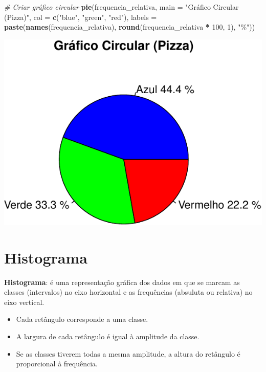 \documentclass[
]{book}
\newenvironment{Shaded}{\begin{snugshade}}{\end{snugshade}}
\newcommand{\AttributeTok}[1]{\textcolor[rgb]{0.13,0.29,0.53}{#1}}
\newcommand{\CommentTok}[1]{\textcolor[rgb]{0.56,0.35,0.01}{\textit{#1}}}
\newcommand{\DecValTok}[1]{\textcolor[rgb]{0.00,0.00,0.81}{#1}}
\newcommand{\FunctionTok}[1]{\textcolor[rgb]{0.13,0.29,0.53}{\textbf{#1}}}
\newcommand{\NormalTok}[1]{#1}
\newcommand{\SpecialCharTok}[1]{\textcolor[rgb]{0.81,0.36,0.00}{\textbf{#1}}}
\newcommand{\StringTok}[1]{\textcolor[rgb]{0.31,0.60,0.02}{#1}}
\begin{document}
\begin{Shaded}
\begin{Highlighting}[]
\CommentTok{\# Criar gráfico circular}
\FunctionTok{pie}\NormalTok{(frequencia\_relativa, }
    \AttributeTok{main =} \StringTok{"Gráfico Circular (Pizza)"}\NormalTok{,}
    \AttributeTok{col =} \FunctionTok{c}\NormalTok{(}\StringTok{"blue"}\NormalTok{, }\StringTok{"green"}\NormalTok{, }\StringTok{"red"}\NormalTok{),}
    \AttributeTok{labels =} \FunctionTok{paste}\NormalTok{(}\FunctionTok{names}\NormalTok{(frequencia\_relativa), }
                   \FunctionTok{round}\NormalTok{(frequencia\_relativa }\SpecialCharTok{*} \DecValTok{100}\NormalTok{, }\DecValTok{1}\NormalTok{), }\StringTok{"\%"}\NormalTok{))}
\end{Highlighting}
\end{Shaded}

\includegraphics{introR_files/figure-latex/unnamed-chunk-168-1.pdf}

\section{Histograma}\label{histograma}

\textbf{Histograma}: é uma representação gráfica dos dados em que se marcam
as classes (intervalos) no eixo horizontal e as frequências (absuluta ou
relativa) no eixo vertical.

\begin{itemize}
\item
  Cada retângulo corresponde a uma classe.
\item
  A largura de cada retângulo é igual à amplitude da classe.
\item
  Se as classes tiverem todas a mesma amplitude, a altura do retângulo é proporcional à frequência.
\end{itemize}
\end{document}
